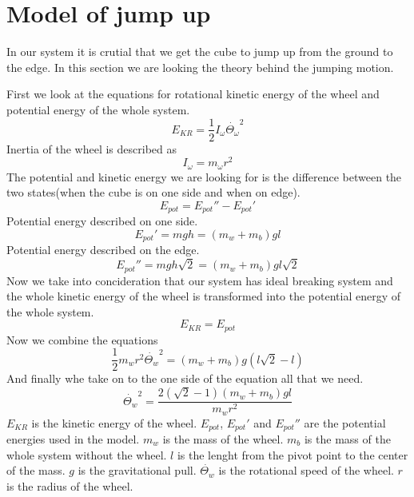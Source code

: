 \section{Model of jump up}
In our system it is crutial that we get the cube to jump up from the ground to the edge.
In this section we are looking the theory behind the jumping motion.


First we look at the equations for rotational kinetic energy of the wheel and potential energy of the whole system. 
\begin{equation}
  \label{eq:kinetic rotational energy}
  E_{KR}= \frac{1}{2}I_{\omega }\dot{\Theta_{\omega }}^{2}
\end{equation}
Inertia of the wheel is described as
\begin{equation}
  \label{eq:moment of inertia of the wheel}
  I_{\omega }=m_{\omega }r^{2}
\end{equation}
The potential and kinetic energy we are looking for is the difference between the two states(when the cube is on one side and when on edge).
\begin{equation}
  \label{eq:potential energy difference}
  E_{pot}={E_{pot}}''-{E_{pot}}'
\end{equation}
Potential energy described on one side.
\begin{equation}
  \label{eq:first potential energy}
  {E_{pot}}'=mgh=(m_{w}+m_{b})gl
\end{equation}
Potential energy described on the edge.
\begin{equation}
  \label{eq second potential energy}
  {E_{pot}}''=mgh\sqrt{2}=(m_{w}+m_{b})gl\sqrt{2}
\end{equation}
Now we take into concideration that our system has ideal breaking system and the whole kinetic energy of the wheel is transformed into the potential energy of the whole system.
\begin{equation}
  \label{eq:wheel kinetic energy transformed into cubes potential energy}
  E_{KR}=E_{pot}
\end{equation}
Now we combine the equations
\begin{equation}
  \label{eq:combination of all the previous equations}
  \frac{1}{2}m_{w}r^{2}\dot{\Theta_{w}}^{2}=(m_{w}+m_{b})g(l\sqrt{2}-l)
\end{equation}
And finally whe take on to the one side of the equation all that we need.
\begin{equation}
  \label{eq square of the speed needed for the cube to jump in position}
  \dot{\Theta_{w}}^{2}=\frac{2(\sqrt{2}-1)(m_{w}+m_{b})gl}{m_{w}r^{2}}
\end{equation}
$E_{KR}$ is the kinetic energy of the wheel.
$E_{pot}$, $E_{pot}'$ and $E_{pot}''$ are the potential energies used in the model.
$m_{w}$ is the mass of the wheel.
$m_{b}$ is the mass of the whole system without the wheel.
$l$ is the lenght from the pivot point to the center of the mass.
$g$ is the gravitational pull.
$\dot{\Theta_{w}}$ is the rotational speed of the wheel.
$r$ is the radius of the wheel.


